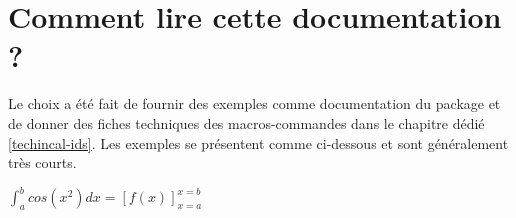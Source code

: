 \documentclass[12pt,a4paper]{book}
\newcommand\dintegrate[5]{%
  \int_{#2}^{#3} #4 d#5%
}
\newcommand\hook[5]{%
	\left[ #4 \right]_{#5=#2}^{#5=#3}%
}
\begin{document}
\section{Comment lire cette documentation ?}

Le choix a été fait de fournir des exemples comme documentation du package et de donner des fiches techniques des macros-commandes dans le chapitre dédié \ref{techincal-ids}.
Les exemples se présentent comme ci-dessous et sont généralement très courts.

\begin{latexex}
$\dintegrate*{a}{b}{cos(x^2)}{x}
 =
 \hook*{a}{b}{f(x)}{x}$
\end{latexex}
\end{document}
